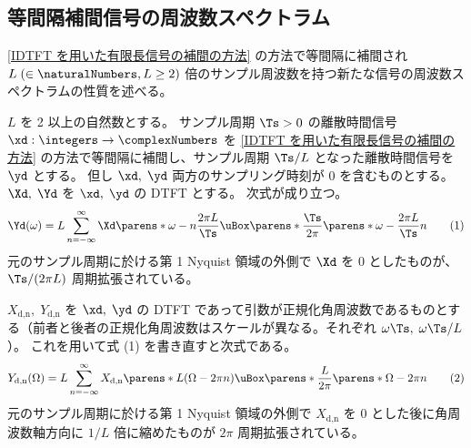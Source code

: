        \subsection{等間隔補間信号の周波数スペクトラム}
            \newcommand{\Xdn}{X_\text{d,n}}
            \newcommand{\Ydn}{Y_\text{d,n}}
            \ref{IDTFT を用いた有限長信号の補間の方法} の方法で等間隔に補間され $L\;(\in\naturalNumbers,L\geq 2)$ 倍のサンプル周波数を持つ新たな信号の周波数スペクトラムの性質を述べる。
            \begin{shadebox}
                $L$ を 2 以上の自然数とする。
                サンプル周期 $\Ts>0$ の離散時間信号 $\xd:\integers\to\complexNumbers$ を \ref{IDTFT を用いた有限長信号の補間の方法} の方法で等間隔に補間し、サンプル周期 $\Ts/L$ となった離散時間信号を $\yd$ とする。
                但し $\xd,\;\yd$ 両方のサンプリング時刻が 0 を含むものとする。
                $\Xd,\;\Yd$ を $\xd,\;\yd$ の DTFT とする。
                次式が成り立つ。
                \[ \Yd(\omega) = L\sum_{n=-\infty}^\infty \Xd\parens*{\omega-n\frac{2\pi L}{\Ts}}\uBox\parens*{\frac{\Ts}{2\pi}\parens*{\omega-\frac{2\pi L}{\Ts}n}} \tag{1} \]
                元のサンプル周期に於ける第 1 Nyquist 領域の外側で $\Xd$ を 0 としたものが、 $\Ts/(2\pi L)$ 周期拡張されている。
                \par
                $\Xdn,\;\Ydn$ を $\xd,\;\yd$ の DTFT であって引数が正規化角周波数であるものとする（前者と後者の正規化角周波数はスケールが異なる。それぞれ $\omega\Ts,\;\omega\Ts/L$）。
                これを用いて式 (1) を書き直すと次式である。
                \[ \Ydn(\Omega) = L\sum_{n=-\infty}^\infty \Xdn\parens*{L(\Omega-2\pi n)}\uBox\parens*{\frac{L}{2\pi}\parens*{\Omega-2\pi n}} \tag{2} \]
                元のサンプル周期に於ける第 1 Nyquist 領域の外側で $\Xdn$ を 0 とした後に角周波数軸方向に $1/L$ 倍に縮めたものが $2\pi$ 周期拡張されている。
            \end{shadebox}
